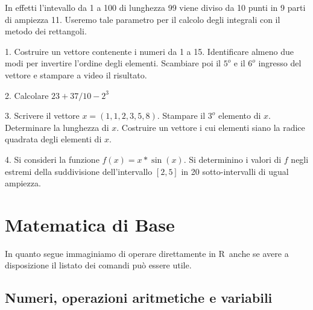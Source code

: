 \documentclass[onecolumn,11pt]{book}\usepackage[]{graphicx}\usepackage[]{color}
\newcommand{\rpr}{\textsf{R}~}
\begin{document}
In effetti l'intevallo da 1 a 100  di lunghezza 99 viene diviso da 10 punti in 9 parti di ampiezza 11. Useremo tale parametro per il calcolo degli integrali con il metodo dei rettangoli.\\
  \begin{shaded}
  \begin{description}
\item{1.} Costruire un vettore contenente i numeri da 1 a 15. Identificare almeno due modi per invertire l'ordine degli elementi. Scambiare poi  il $5^o$  e il $6^o$ ingresso del vettore e stampare a video il risultato.
\item{2.} Calcolare $23+37/10-2^3$
\item{3.} Scrivere il vettore
$x =(1,1,2,3,5,8)$.
Stampare il $3^o$  elemento di $x$. Determinare la lunghezza di $x$.
Costruire un vettore i cui elementi siano la radice quadrata degli elementi di $x$.
\item{4.} Si consideri la funzione $f(x)=x*\sin(x)$. Si determinino i valori di $f$ negli estremi della suddivisione dell'intervallo $[2,5]$  in 20 sotto-intervalli di ugual ampiezza.
\end{description}
\end{shaded}
\chapter{Matematica di Base}
In quanto segue immaginiamo di operare direttamente in \rpr anche se avere a disposizione il listato dei comandi pu\`o essere utile.
\section{Numeri, operazioni aritmetiche e variabili}
\end{document}
